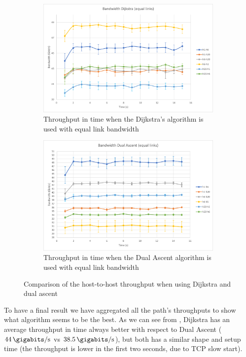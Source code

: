 \begin{figure}
	\centering
	\begin{subfigure}[b]{\textwidth}
		\centering
		\includegraphics[width=\textwidth]{img/band-eq-dijkstra.png}
		\caption{Throughput in time when the Dijkstra's algorithm is
		used with equal link bandwidth}\label{subfig:band-eq-dijkstra}
	\end{subfigure}
	\begin{subfigure}[b]{\textwidth}
		\centering
		\includegraphics[width=\textwidth]{img/band-eq-dual.png}
		\caption{Throughput in time when the Dual Ascent algorithm is
		used with equal link bandwidth}\label{subfig:band-eq-dual}
	\end{subfigure}
	\caption{Comparison of the host-to-host throughput when using Dijkstra
	and dual ascent}\label{fig:bandwidth-equallinks}
\end{figure}

To have a final result we have aggregated all the path's throughputs to show
what algorithm seems to be the best. As we can see from
, Dijkstra has an average throughput in time
always better with respect to Dual Ascent (\(\SI{44}{\gigabits\per\second}\) vs
\(\SI{38.5}{\gigabits\per\second}\)), but both has a similar shape and setup
time (the throughput is lower in the first two seconds, due to TCP slow start).

